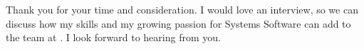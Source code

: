 


Thank you for your time and consideration. I would love an interview, so we can discuss how my skills and my growing passion for Systems Software can add to the team at \company. I look forward to hearing from you.
